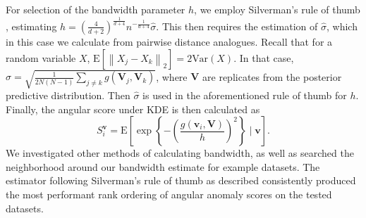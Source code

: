 For selection of the bandwidth parameter $h$, we employ Silverman's rule of
    thumb \citep{silverman2018}, estimating 
    $h = \left(\frac{4}{d+2}\right)^{\frac{1}{d+4}}
        n^{-\frac{1}{d+4}}\hat{\sigma}$.
    This then requires the estimation of $\hat{\sigma}$, which in this case we
    calculate from pairwise distance analogues.  Recall that for a random 
    variable $X$,
    $\text{E}\left[\left\lVert X_j - X_k\right\rVert_2\right] 
        = 2\text{Var}(X)$.
    In that case, $\hat{\sigma} = 
        \sqrt{\frac{1}{2N(N-1)}\sum_{j\neq k}g(\bm{V}_j,\bm{V}_k)}$, where
    $\bm{V}$ are replicates from the posterior predictive distribution.
    Then $\hat{\sigma}$ is used in the aforementioned rule of thumb for $h$.
    Finally, the angular score under KDE is then calculated as
    \begin{equation}
    \label{eqn:ad_kde_h}
    S_i^{\bm{v}} = \text{E}\left[\exp\left\lbrace -
    \left(\frac{g(\bm{v}_i,\bm{V})}{h}\right)^2\right\rbrace\mid\bm{v}\right].
    \end{equation}
    We investigated other methods of calculating bandwidth, as well as searched
    the neighborhood around our bandwidth estimate for example datasets.
    The estimator following Silverman's rule of thumb as described consistently 
    produced the most performant rank ordering of angular anomaly scores on the
    tested datasets.


